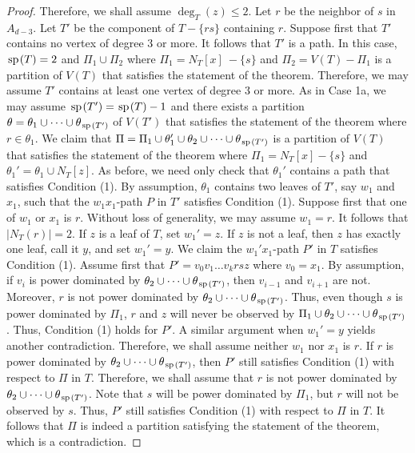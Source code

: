 \documentclass[11pt]{article}
\newcommand{\spider}{\hskip1pt \textrm{sp} \hskip1pt}
\begin{document}
\begin{proof}
Therefore, we shall assume $\deg_T(z) \le 2$. Let $r$ be the neighbor of $s$ in $A_{d-3}$. Let $T'$ be the component of $T - \{rs\}$ containing $r$. Suppose first that $T'$ contains no vertex of degree $3$ or more. It follows that $T'$ is a path. In this case, $\spider(T) = 2$ and $\Pi_1 \cup \Pi_2$ where $\Pi_1 = N_T[x]\ - \{s\}$ and $\Pi_2 = V(T) - \Pi_1$ is a partition of $V(T)$ that satisfies the statement of the theorem. Therefore, we may assume $T'$ contains at least one vertex of degree $3$ or more. As in Case 1a, we may assume $\spider(T') = \spider(T)-1$ and there exists a partition $\theta = \theta_1 \cup \cdots \cup \theta_{\spider(T')}$ of $V(T')$ that satisfies the statement of the theorem where $r \in \theta_1$. We claim that $\Pi = \Pi_1 \cup \theta_1' \cup \theta_2 \cup \cdots \cup \theta_{\spider(T')}$ is a partition of $V(T)$ that satisfies the statement of the theorem where $\Pi_1 = N_T[x] - \{s\}$ and $\theta_1' = \theta_1 \cup N_T[z]$. As before, we need only check that $\theta_1'$ contains a path that satisfies Condition (1).  By assumption, $\theta_1$ contains two leaves of $T'$, say $w_1$ and $x_1$, such that the $w_1x_1$-path $P$ in $T'$ satisfies Condition (1). Suppose first that one of $w_1$ or $x_1$ is $r$. Without loss of generality, we may assume $w_1 = r$. It follows that $|N_T(r)| = 2$. If $z$ is a leaf of $T$, set $w_1' = z$. If $z$ is not a leaf, then $z$ has exactly one leaf, call it $y$,  and set $w_1' = y$. We claim the $w_1'x_1$-path $P'$ in $T$ satisfies Condition (1). Assume first that $P' = v_0v_1\dots v_krsz$ where $v_0=x_1$. By assumption, if $v_i$ is power dominated by $\theta_2 \cup \cdots \cup \theta_{\spider(T')}$, then $v_{i-1}$ and $v_{i+1}$ are not. Moreover, $r$ is not power dominated by $\theta_2 \cup \cdots \cup \theta_{\spider(T')}$. Thus, even though $s$ is power dominated by $\Pi_1$, $r$ and $z$ will never be observed by $\Pi_1 \cup \theta_2 \cup \cdots \cup \theta_{\spider(T')}$. Thus, Condition (1) holds for $P'$. A similar argument when $w_1' = y$ yields another contradiction. Therefore, we shall assume neither $w_1$ nor $x_1$ is $r$. If $r$ is power dominated by $\theta_2 \cup \cdots \cup \theta_{\spider(T')}$, then $P'$ still satisfies Condition (1) with respect to $\Pi$ in $T$. Therefore, we shall assume that $r$ is not power dominated by $\theta_2 \cup \cdots \cup \theta_{\spider(T')}$. Note that $s$ will be power dominated by $\Pi_1$, but $r$ will not be observed by $s$. Thus, $P'$ still satisfies Condition (1) with respect to $\Pi$ in $T$. It follows that $\Pi$ is indeed a partition satisfying the statement of the theorem, which is a contradiction. 
\vskip5mm


\end{proof}
\end{document}
